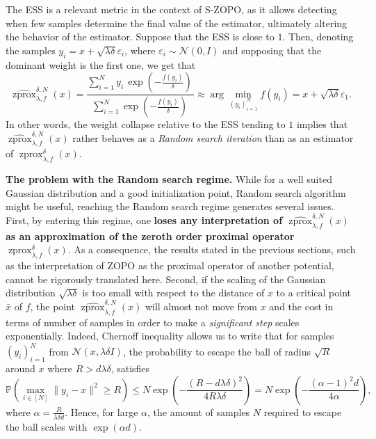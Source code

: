 \documentclass{article}
\newcommand{\zprox}{\ensuremath{\operatorname{zprox}}}
\newcommand{\szprox}{\ensuremath{\widehat{\operatorname{zprox}}}}
\begin{document}
The ESS is a relevant metric in the context of S-ZOPO, as it allows detecting when few samples determine the final value of the estimator, ultimately altering the behavior of the estimator. Suppose that the ESS is close to \(1\). Then, denoting the samples \(y_i=x+\sqrt{\lambda\delta}\varepsilon_i\), where \( \varepsilon_i\sim\mathcal{N}\left(0,I\right)\)
and supposing that the dominant weight is the first one, we get that
\[\szprox^{\delta,N}_{\lambda, f}(x)=\frac{\sum_{i=1}^N y_i\,
\exp\!\left(-\frac{f(y_i)}{\delta}\right)\,
}
{\sum_{i=1}^N
\exp\!\left(-\frac{f(y_i)}{\delta}\right)\,}\approx \arg\min_{\left(y_i\right)_{i=1}^N}f(y_i)=x+\sqrt{\lambda\delta}\varepsilon_1.\]
In other words, the weight collapse relative to the ESS tending to \(1\) implies that \(\szprox^{\delta,N}_{\lambda, f}(x)\) rather behaves as a \emph{Random search iteration} than as an estimator of \(\zprox^{\delta}_{\lambda, f}(x)\).

\textbf{The problem with the Random search regime.} While for a well suited Gaussian distribution and a good initialization point, Random search algorithm might be useful, reaching the Random search regime generates several issues. First, by entering this regime, one \textbf{loses any interpretation of \(\szprox^{\delta,N}_{\lambda, f}(x)\) as an approximation of the zeroth order proximal operator \(\zprox^{\delta}_{\lambda, f}(x)\)}. As a consequence, the results stated in the previous sections, such as the interpretation of ZOPO as the proximal operator of another potential, cannot be rigorously translated here. Second, if the scaling of the Gaussian distribution \(\sqrt{\lambda\delta}\) is too small with respect to the distance of \(x\) to a critical point \(\bar x\) of \(f\), the point \(\szprox^{\delta,N}_{\lambda, f}(x)\) will almost not move from \(x\) and the cost in terms of number of samples in order to make a \textit{significant step} scales exponentially. Indeed, Chernoff inequality allows us to write that for samples \(\left(y_i\right)_{i=1}^N\) from \(\mathcal{N}(x,\lambda\delta I)\), the probability to escape the ball of radius \(\sqrt{R}\) around \(x\) where \(R>d\lambda\delta\), satisfies
\begin{equation}\label{eq:escaping_probability}\mathbb{P}\left(\max_{i\in[N]}\|y_i-x\|^2\ge R\right)\le N\exp\left(-\frac{(R-d\lambda\delta)^2}{4R\lambda\delta}\right)=N\exp\left(-\frac{(\alpha-1)^2d}{4\alpha}\right),\end{equation}
where \(\alpha=\frac{R}{\lambda\delta d}\). Hence, for large \(\alpha\), the amount of samples \(N\) required to escape the ball scales with \(\exp(\alpha d)\).
\end{document}
